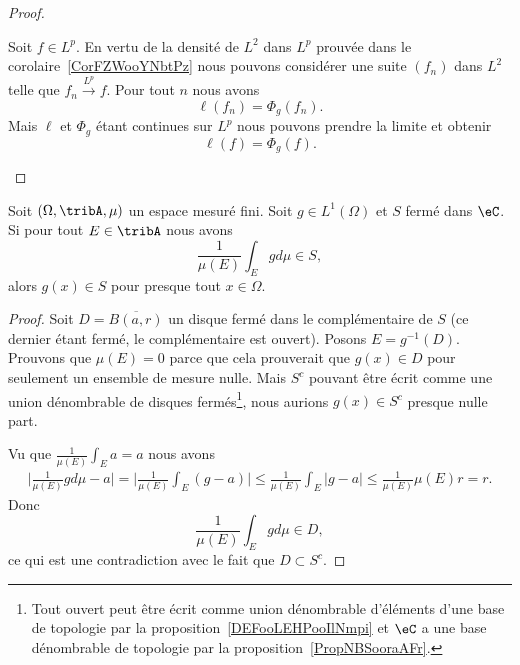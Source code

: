 \begin{proof}
\begin{subproof}
\begin{subproof}
			\spitem[\( \ell(f)=\Phi_g(f)\)]

			Soit \( f\in L^p\). En vertu de la densité de \( L^2\) dans \( L^p\) prouvée dans le corolaire~\ref{CorFZWooYNbtPz} nous pouvons considérer une suite \( (f_n)\) dans \( L^2\) telle que \( f_n\stackrel{L^p}{\longrightarrow}f\). Pour tout \( n\) nous avons
			\begin{equation}
				\ell(f_n)=\Phi_g(f_n).
			\end{equation}
			Mais \( \ell\) et \( \Phi_g\) étant continues sur \( L^p\) nous pouvons prendre la limite et obtenir
			\begin{equation}
				\ell(f)=\Phi_g(f).
			\end{equation}
		\end{subproof}
	\end{subproof}
\end{proof}

\begin{lemma} \label{LemHNPEooHtMOGY}
	Soit \( (\Omega,\tribA,\mu)\) un espace mesuré fini. Soit \( g\in L^1(\Omega)\) et \( S\) fermé dans \( \eC\). Si pour tout \( E\in \tribA\) nous avons
	\begin{equation}
		\frac{1}{ \mu(E) }\int_Egd\mu\in S,
	\end{equation}
	alors \( g(x)\in S\) pour presque tout \( x\in \Omega\).
\end{lemma}

\begin{proof}
	Soit \( D=\overline{ B(a,r) }\) un disque fermé dans le complémentaire de \( S\) (ce dernier étant fermé, le complémentaire est ouvert). Posons \( E=g^{-1}(D)\). Prouvons que \( \mu(E)=0\) parce que cela prouverait que \( g(x)\in D\) pour seulement un ensemble de mesure nulle. Mais \( S^c\) pouvant être écrit comme une union dénombrable de disques fermés\footnote{Tout ouvert peut être écrit comme union dénombrable d'éléments d'une base de topologie par la proposition~\ref{DEFooLEHPooIlNmpi} et \( \eC\) a une base dénombrable de topologie par la proposition~\ref{PropNBSooraAFr}.}, nous aurions \( g(x)\in S^c\) presque nulle part.

	Vu que \( \frac{1}{ \mu(E) }\int_Ea=a\) nous avons
	\begin{subequations}
		\begin{align}
			\big| \frac{1}{ \mu(E) }gd\mu-a \big|=\big| \frac{1}{ \mu(E) }\int_E(g-a) \big|\leq  \frac{1}{ \mu(E) }\int_E| g-a |\leq\frac{1}{ \mu(E) }\mu(E)r=r.
		\end{align}
	\end{subequations}
	Donc
	\begin{equation}
		\frac{1}{ \mu(E) }\int_Egd\mu\in D,
	\end{equation}
	ce qui est une contradiction avec le fait que \( D\subset S^c\).
\end{proof}

